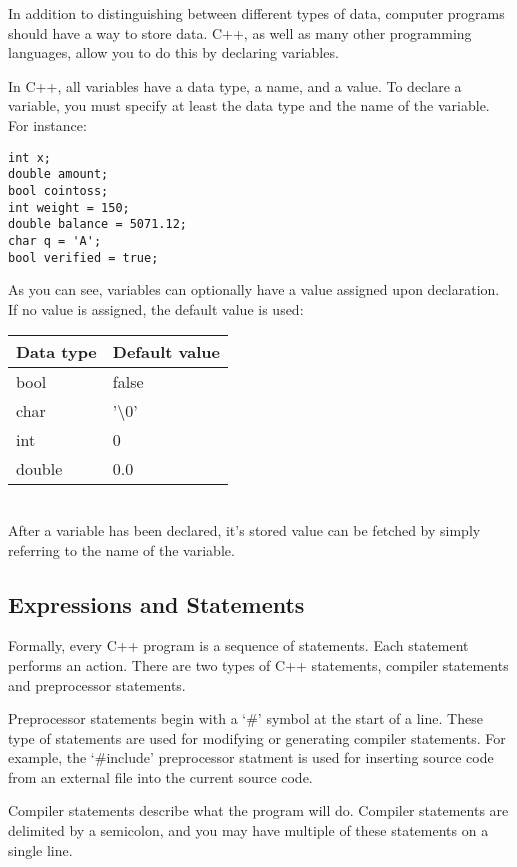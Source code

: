 \documentclass[a4paper,12pt]{article}
\begin{document}
In addition to distinguishing between different types of data, computer programs should have a way to store data. C++, as well as many other programming languages, allow you to do this by declaring variables.

In C++, all variables have a data type, a name, and a value. To declare a variable, you must specify at least the data type and the name of the variable. For instance:

\begin{lstlisting}[caption=A series of variable declarations in C++]
int x;
double amount;
bool cointoss;
int weight = 150;
double balance = 5071.12;
char q = 'A';
bool verified = true;
\end{lstlisting}

As you can see, variables can optionally have a value assigned upon declaration. If no value is assigned, the default value is used: \\

\begin{tabular}{|l|l|}
\hline
{\bf Data type} & {\bf Default value} \\
\hline
bool & false \\
\hline
char & '\textbackslash 0' \\
\hline
int & 0 \\
\hline
double & 0.0 \\
\hline
\end{tabular} \\

After a variable has been declared, it's stored value can be fetched by simply referring to the name of the variable. 

\subsection*{Expressions and Statements}

Formally, every C++ program is a sequence of statements. Each statement performs an action. There are two types of C++ statements, compiler statements and preprocessor statements. 

Preprocessor statements begin with a `\#' symbol at the start of a line. These type of statements are used for modifying or generating compiler statements. For example, the `\#include' preprocessor statment is used for inserting source code from an external file into the current source code. 

Compiler statements describe what the program will do. Compiler statements are delimited by a semicolon, and you may have multiple of these statements on a single line.
\end{document}
